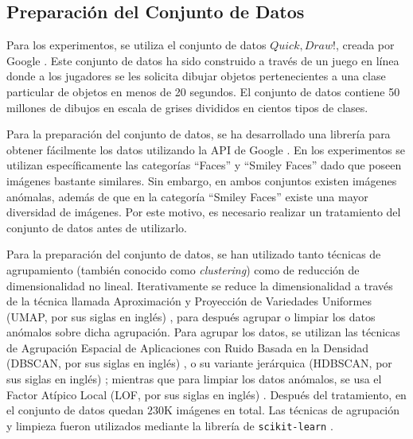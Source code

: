 
\subsection{Preparación del Conjunto de Datos}\label{ssec:preparacion-dataset}  %

Para los experimentos, se utiliza el conjunto de datos $Quick, Draw!$, creada por Google \cite{jongejan2016quick}. Este conjunto de datos ha sido construido a través de un juego en línea donde a los jugadores se les solicita dibujar objetos pertenecientes a una clase particular de objetos en menos de 20 segundos. El conjunto de datos contiene 50 millones de dibujos en escala de grises divididos en cientos tipos de clases.

Para la preparación del conjunto de datos, se ha desarrollado una librería para obtener fácilmente los datos utilizando la API de Google \cite{munoz2023quicktorch}.
En los experimentos se utilizan específicamente las categorías ``Faces'' y ``Smiley Faces''
dado que poseen imágenes bastante similares. Sin embargo, en ambos conjuntos existen imágenes anómalas, además de que en la categoría ``Smiley Faces'' existe una mayor diversidad de imágenes. Por este motivo, es necesario realizar un tratamiento del conjunto de datos antes de utilizarlo.

Para la preparación del conjunto de datos, se han utilizado tanto técnicas de agrupamiento (también conocido como \textit{clustering}) como de reducción de dimensionalidad no lineal.
Iterativamente se reduce la dimensionalidad a través de la técnica llamada Aproximación y Proyección de Variedades Uniformes (UMAP, por sus siglas en inglés) \cite{mcinnes2018umap}, para después agrupar o limpiar los datos anómalos sobre dicha agrupación. Para agrupar los datos, se utilizan las técnicas de Agrupación Espacial de Aplicaciones con Ruido Basada en la Densidad (DBSCAN, por sus siglas en inglés) \cite{ester1996density}, o su variante jerárquica (HDBSCAN, por sus siglas en inglés) \cite{campello2013density};
mientras que para limpiar los datos anómalos, se usa el Factor Atípico Local (LOF, por sus siglas en inglés) \cite{breunig2000lof}. Después del tratamiento, en el conjunto de datos quedan $230$K imágenes en total. Las técnicas de agrupación y limpieza fueron utilizados mediante la librería de \texttt{scikit-learn} \cite{sklearn}.


